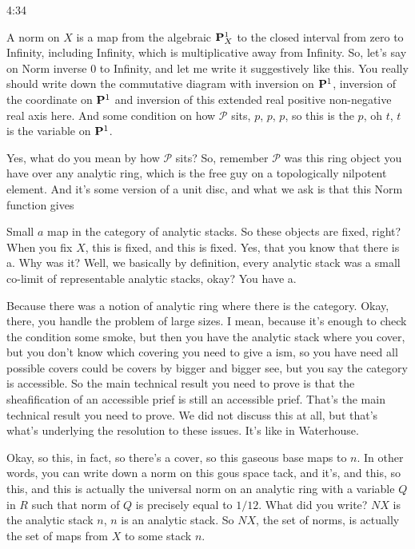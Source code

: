\begin{unfinished}{4:34}
\begin{example}
\begin{example}
\begin{example}
A norm on $X$ is a map from the algebraic $\P^1_X$ to the closed interval from zero to Infinity, including Infinity, which is multiplicative away from Infinity. So, let's say on Norm inverse $0$ to Infinity, and let me write it suggestively like this. You really should write down the commutative diagram with inversion on $\P^1$, inversion of the coordinate on $\P^1$ and inversion of this extended real positive non-negative real axis here. And some condition on how $\mathcal{P}$ sits, $p$, $p$, $p$, so this is the $p$, oh $t$, $t$ is the variable on $\P^1$.

Yes, what do you mean by how $\mathcal{P}$ sits? So, remember $\mathcal{P}$ was this ring object you have over any analytic ring, which is the free guy on a topologically nilpotent element. And it's some version of a unit disc, and what we ask is that this Norm function gives

Small $a$ map in the category of analytic stacks. So these objects are fixed, right? When you fix $X$, this is fixed, and this is fixed. Yes, that you know that there is a. Why was it? Well, we basically by definition, every analytic stack was a small co-limit of representable analytic stacks, okay? You have a.

Because there was a notion of analytic ring where there is the category. Okay, there, you handle the problem of large sizes. I mean, because it's enough to check the condition some smoke, but then you have the analytic stack where you cover, but you don't know which covering you need to give a ism, so you have need all possible covers could be covers by bigger and bigger see, but you say the category is accessible. So the main technical result you need to prove is that the sheafification of an accessible prief is still an accessible prief. That's the main technical result you need to prove. We did not discuss this at all, but that's what's underlying the resolution to these issues. It's like in Waterhouse.

Okay, so this, in fact, so there's a cover, so this gaseous base maps to $n$. In other words, you can write down a norm on this gous space tack, and it's, and this, so this, and this is actually the universal norm on an analytic ring with a variable $Q$ in $R$ such that norm of $Q$ is precisely equal to $1/12$. What did you write? $NX$ is the analytic stack $n$, $n$ is an analytic stack. So $NX$, the set of norms, is actually the set of maps from $X$ to some stack $n$.


\end{example}
\end{example}
\end{example}
\end{unfinished}
